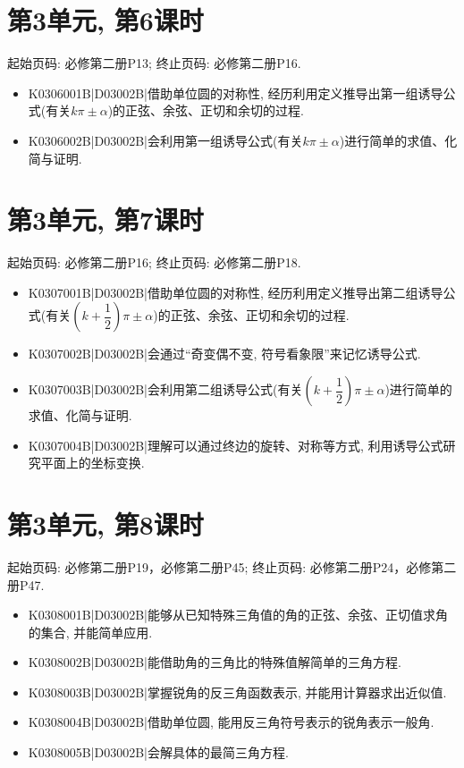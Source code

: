 \section*{第3单元, 第6课时}
起始页码: 必修第二册P13; 终止页码: 必修第二册P16.
\begin{itemize}
\item K0306001B|D03002B|借助单位圆的对称性, 经历利用定义推导出第一组诱导公式(有关$k\pi\pm \alpha$)的正弦、余弦、正切和余切的过程.
\item K0306002B|D03002B|会利用第一组诱导公式(有关$k\pi\pm \alpha$)进行简单的求值、化简与证明.
\end{itemize}

\section*{第3单元, 第7课时}
起始页码: 必修第二册P16; 终止页码: 必修第二册P18.
\begin{itemize}
\item K0307001B|D03002B|借助单位圆的对称性, 经历利用定义推导出第二组诱导公式(有关$(k+\dfrac 12)\pi\pm \alpha$)的正弦、余弦、正切和余切的过程.
\item K0307002B|D03002B|会通过``奇变偶不变, 符号看象限''来记忆诱导公式.
\item K0307003B|D03002B|会利用第二组诱导公式(有关$(k+\dfrac 12)\pi\pm \alpha$)进行简单的求值、化简与证明.
\item K0307004B|D03002B|理解可以通过终边的旋转、对称等方式, 利用诱导公式研究平面上的坐标变换.
\end{itemize}

\section*{第3单元, 第8课时}
起始页码: 必修第二册P19，必修第二册P45; 终止页码: 必修第二册P24，必修第二册P47.
\begin{itemize}
\item K0308001B|D03002B|能够从已知特殊三角值的角的正弦、余弦、正切值求角的集合, 并能简单应用.
\item K0308002B|D03002B|能借助角的三角比的特殊值解简单的三角方程.
\item K0308003B|D03002B|掌握锐角的反三角函数表示, 并能用计算器求出近似值.
\item K0308004B|D03002B|借助单位圆, 能用反三角符号表示的锐角表示一般角.
\item K0308005B|D03002B|会解具体的最简三角方程.
\end{itemize}

